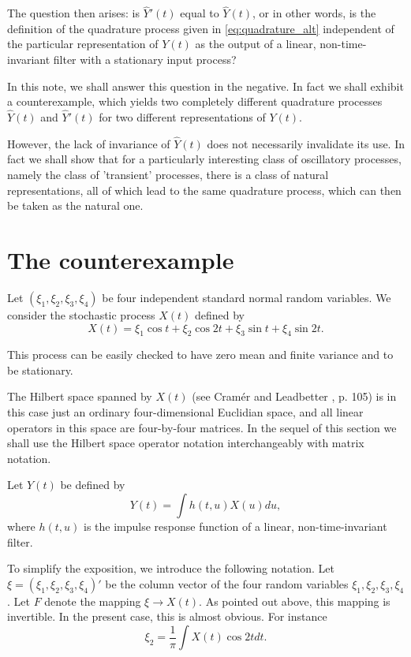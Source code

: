 \documentclass{article}
\begin{document}
The question then arises: is $\hat{Y}'(t)$ equal to $\hat{Y}(t)$, or in other words, is the
definition of the quadrature process given in \eqref{eq:quadrature_alt} independent of the particular
representation of $Y(t)$ as the output of a linear, non-time-invariant filter with a
stationary input process?

In this note, we shall answer this question in the negative. In fact we shall exhibit a counterexample, which yields two completely different quadrature
processes $\hat{Y}(t)$ and $\hat{Y}'(t)$ for two different representations of $Y(t)$.

However, the lack of invariance of $\hat{Y}(t)$ does not necessarily invalidate its use.
In fact we shall show that for a particularly interesting class of oscillatory
processes, namely the class of 'transient' processes, there is a class of natural
representations, all of which lead to the same quadrature process, which can
then be taken as the natural one.

\section{The counterexample}

Let $(\xi_1, \xi_2, \xi_3, \xi_4)$ be four independent standard normal random variables. We
consider the stochastic process $X(t)$ defined by
\begin{equation}
\label{eq:x_counter}
X(t) = \xi_1 \cos t + \xi_2 \cos 2t + \xi_3 \sin t + \xi_4 \sin 2t.
\end{equation}

This process can be easily checked to have zero mean and finite variance and to
be stationary.

The Hilbert space spanned by $X(t)$ (see Cramér and Leadbetter \cite{cramer1967}, p. 105) is
in this case just an ordinary four-dimensional Euclidian space, and all linear operators in this space are four-by-four matrices. In the sequel of this section we
shall use the Hilbert space operator notation interchangeably with matrix
notation.

Let $Y(t)$ be defined by
\begin{equation}
\label{eq:y_counter}
Y(t) = \int h(t, u)X(u)du,
\end{equation}
where $h(t, u)$ is the impulse response function of a linear, non-time-invariant
filter.

To simplify the exposition, we introduce the following notation. Let $\xi =
(\xi_1, \xi_2, \xi_3, \xi_4)'$ be the column vector of the four random variables $\xi_1, \xi_2, \xi_3, \xi_4$.
Let $F$ denote the mapping $\xi \to X(t)$. As pointed out above, this mapping is
invertible. In the present case, this is almost obvious. For instance
\begin{equation}
\label{eq:xi_example}
\xi_2 = \frac{1}{\pi} \int X(t) \cos 2t dt.
\end{equation}
\end{document}
